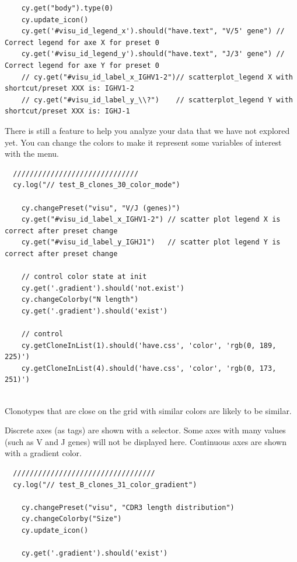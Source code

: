 \begin{verbatim}
    cy.get("body").type(0)
    cy.update_icon()
    cy.get('#visu_id_legend_x').should("have.text", "V/5' gene") // Correct legend for axe X for preset 0
    cy.get('#visu_id_legend_y').should("have.text", "J/3' gene") // Correct legend for axe Y for preset 0
    // cy.get("#visu_id_label_x_IGHV1-2")// scatterplot_legend X with shortcut/preset XXX is: IGHV1-2
    // cy.get("#visu_id_label_y_\\?")    // scatterplot_legend Y with shortcut/preset XXX is: IGHJ-1

\end{verbatim}

There is still a feature to help you analyze your data that we have not
explored yet.
You can change the colors to make it represent some variables of interest
with the  menu.
\begin{verbatim}
  //////////////////////////////
  cy.log("// test_B_clones_30_color_mode")

    cy.changePreset("visu", "V/J (genes)")
    cy.get("#visu_id_label_x_IGHV1-2") // scatter plot legend X is correct after preset change
    cy.get("#visu_id_label_y_IGHJ1")   // scatter plot legend Y is correct after preset change

    // control color state at init
    cy.get('.gradient').should('not.exist')
    cy.changeColorby("N length")
    cy.get('.gradient').should('exist')

    // control
    cy.getCloneInList(1).should('have.css', 'color', 'rgb(0, 189, 225)')
    cy.getCloneInList(4).should('have.css', 'color', 'rgb(0, 173, 251)')


\end{verbatim}
  
Clonotypes that are close on the grid with similar colors are likely to
be similar.

Discrete axes (as tags) are shown with a selector.
Some axes with many values (such as V and J genes) will not be displayed here.
Continuous axes are shown with a gradient color.
\begin{verbatim}
  //////////////////////////////////
  cy.log("// test_B_clones_31_color_gradient")

    cy.changePreset("visu", "CDR3 length distribution")
    cy.changeColorby("Size")
    cy.update_icon()

    cy.get('.gradient').should('exist')


\end{verbatim}

